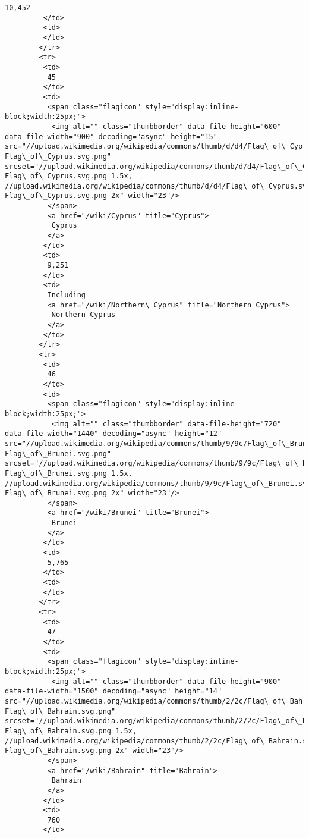 \documentclass[11pt]{article}
\begin{document}
\begin{Verbatim}[commandchars=\\\{\}]
          10,452
         </td>
         <td>
         </td>
        </tr>
        <tr>
         <td>
          45
         </td>
         <td>
          <span class="flagicon" style="display:inline-block;width:25px;">
           <img alt="" class="thumbborder" data-file-height="600" data-file-width="900" decoding="async" height="15" src="//upload.wikimedia.org/wikipedia/commons/thumb/d/d4/Flag\_of\_Cyprus.svg/23px-Flag\_of\_Cyprus.svg.png" srcset="//upload.wikimedia.org/wikipedia/commons/thumb/d/d4/Flag\_of\_Cyprus.svg/35px-Flag\_of\_Cyprus.svg.png 1.5x, //upload.wikimedia.org/wikipedia/commons/thumb/d/d4/Flag\_of\_Cyprus.svg/45px-Flag\_of\_Cyprus.svg.png 2x" width="23"/>
          </span>
          <a href="/wiki/Cyprus" title="Cyprus">
           Cyprus
          </a>
         </td>
         <td>
          9,251
         </td>
         <td>
          Including
          <a href="/wiki/Northern\_Cyprus" title="Northern Cyprus">
           Northern Cyprus
          </a>
         </td>
        </tr>
        <tr>
         <td>
          46
         </td>
         <td>
          <span class="flagicon" style="display:inline-block;width:25px;">
           <img alt="" class="thumbborder" data-file-height="720" data-file-width="1440" decoding="async" height="12" src="//upload.wikimedia.org/wikipedia/commons/thumb/9/9c/Flag\_of\_Brunei.svg/23px-Flag\_of\_Brunei.svg.png" srcset="//upload.wikimedia.org/wikipedia/commons/thumb/9/9c/Flag\_of\_Brunei.svg/35px-Flag\_of\_Brunei.svg.png 1.5x, //upload.wikimedia.org/wikipedia/commons/thumb/9/9c/Flag\_of\_Brunei.svg/46px-Flag\_of\_Brunei.svg.png 2x" width="23"/>
          </span>
          <a href="/wiki/Brunei" title="Brunei">
           Brunei
          </a>
         </td>
         <td>
          5,765
         </td>
         <td>
         </td>
        </tr>
        <tr>
         <td>
          47
         </td>
         <td>
          <span class="flagicon" style="display:inline-block;width:25px;">
           <img alt="" class="thumbborder" data-file-height="900" data-file-width="1500" decoding="async" height="14" src="//upload.wikimedia.org/wikipedia/commons/thumb/2/2c/Flag\_of\_Bahrain.svg/23px-Flag\_of\_Bahrain.svg.png" srcset="//upload.wikimedia.org/wikipedia/commons/thumb/2/2c/Flag\_of\_Bahrain.svg/35px-Flag\_of\_Bahrain.svg.png 1.5x, //upload.wikimedia.org/wikipedia/commons/thumb/2/2c/Flag\_of\_Bahrain.svg/46px-Flag\_of\_Bahrain.svg.png 2x" width="23"/>
          </span>
          <a href="/wiki/Bahrain" title="Bahrain">
           Bahrain
          </a>
         </td>
         <td>
          760
         </td>

\end{Verbatim}
\end{document}
